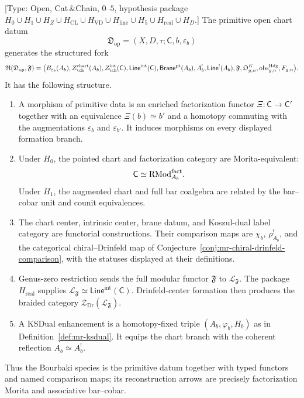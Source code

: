 \begin{theorem}
\label{thm:mr-bourbaki}
\ClaimStatusConditional
{}
\textup{[Type: Open, Cat$\,\&$Chain, $0\text{--}5$, hypothesis package
$H_0\cup H_1\cup H_Z\cup H_{\mathrm{CL}}
\cup H_{\mathrm{VD}}
\cup H_{\mathrm{line}}\cup H_5\cup H_{\mathrm{real}}\cup H_D$.]}
The primitive open chart datum
\[
 \mathfrak D_{\mathrm{op}}
 =(X,D,\tau;\mathsf C,b,\varepsilon_b)
\]
generates the structured fork
\[
 \mathfrak R(\mathfrak D_{\mathrm{op}},\mathfrak F)
 =\bigl(
 B_{\varepsilon_b}(A_b),
 Z_{\ch}^{\mathrm{chart}}(A_b),
 Z_{\ch}^{\mathrm{int}}(\mathsf C),
 \mathsf{Line}^{\mathrm{int}}(\mathsf C),
 \mathsf{Brane}^{\mathrm{pt}}(A_b),
 A_b^!,\mathsf{Line}^{!}(A_b),
 \mathfrak F,\mathfrak O^K_{g,n},
 \operatorname{obs}^{\mathrm{Hdg}}_{g,n},F_{g,n}
 \bigr).
\]
It has the following structure.
\begin{enumerate}[label=\textup{(\arabic*)}]
\item A morphism of primitive data is an enriched factorization
functor $\Xi\colon\mathsf C\to\mathsf C'$ together with an equivalence
$\Xi(b)\simeq b'$ and a homotopy commuting with the augmentations
$\varepsilon_b$ and $\varepsilon_{b'}$.  It induces morphisms on every
displayed formation branch.
\item Under $H_0$, the pointed chart and factorization category are
Morita-equivalent:
\[
 \mathsf C\simeq\mathrm{RMod}^{\mathrm{fact}}_{A_b}.
\]
Under $H_1$, the augmented chart and full bar coalgebra are related by
the bar--cobar unit and counit equivalences.
\item The chart center, intrinsic center, brane datum, and
Koszul-dual label category are functorial constructions.  Their comparison
maps are $\chi_b$, $\rho_{A_b}^!$, and the categorical
chiral--Drinfeld map of
Conjecture~\ref{conj:mr-chiral-drinfeld-comparison}, with the statuses
displayed at their definitions.
\item Genus-zero restriction sends the full modular functor
$\mathfrak F$ to $\mathcal L_{\mathfrak F}$.  The package
$H_{\mathrm{real}}$ supplies
$\mathcal L_{\mathfrak F}\simeq
\mathsf{Line}^{\mathrm{int}}(\mathsf C)$.  Drinfeld-center formation
then produces the braided category
$\mathcal Z_{\mathrm{Dr}}(\mathcal L_{\mathfrak F})$.
\item A KSDual enhancement is a homotopy-fixed triple
$(A_b,\varphi_b,H_b)$ as in
Definition~\ref{def:mr-ksdual}.  It equips the chart branch with the
coherent reflection $A_b\simeq A_b^!$.
\end{enumerate}
Thus the Bourbaki species is the primitive datum together with typed
functors and named comparison maps; its reconstruction
arrows are precisely factorization Morita and associative
bar--cobar.
\end{theorem}

